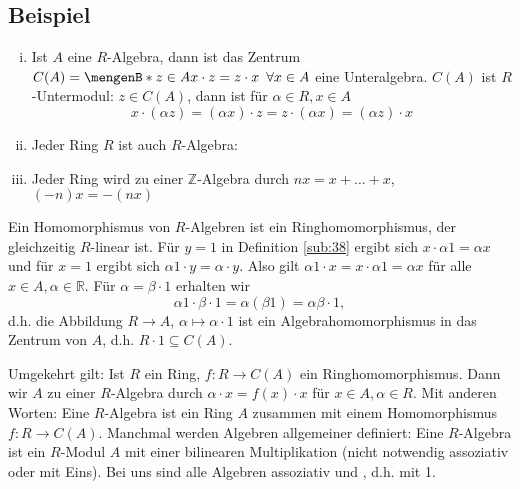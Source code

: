 \subsection[Beispiele für Algebren]{Beispiel} %
\label{sub:39}
\begin{enumerate}[(i)]
	\item Ist $A$ eine $R$-Algebra, dann ist das Zentrum $C(A) = \set[z \in A]{x \cdot z = z \cdot x \enspace \forall x \in A} $ eine Unteralgebra. 
	$C(A)$ ist $R$-Untermodul: $z \in C(A)$, dann ist für $\alpha \in R, x \in A$
		\[
			x \cdot (\alpha z) = (\alpha x) \cdot z = z \cdot (\alpha x) = (\alpha z) \cdot x
		\]
	\item Jeder Ring $R$ ist auch $R$-Algebra: 
	\item Jeder Ring wird zu einer $\mathds{Z}$-Algebra durch $n x = x + \ldots + x$, $(-n) x = - (n x)$
\end{enumerate}
Ein Homomorphismus von $R$-Algebren ist ein Ringhomomorphismus, der gleichzeitig $R$-linear ist.
Für $y=1$ in Definition \ref{sub:38} ergibt sich $x \cdot  \alpha 1 = \alpha x$ und für $x=1$ ergibt sich $\alpha 1 \cdot y = \alpha \cdot y$. Also gilt 
$\alpha 1  \cdot x = x \cdot  \alpha 1 = \alpha x$ für alle $x \in A, \alpha \in \mathds{R}$. Für $\alpha = \beta \cdot 1$ erhalten wir 
\[
	\alpha 1 \cdot \beta \cdot 1 = \alpha (\beta 1) = \alpha \beta \cdot 1,
\]
d.h. die Abbildung $R \to A$, $\alpha \mapsto \alpha \cdot 1$ ist ein Algebrahomomorphismus in das Zentrum von $A$, d.h. $R \cdot 1 \subseteq C(A)$.

Umgekehrt gilt: Ist $R$ ein Ring, $f : R \to C(A)$ ein Ringhomomorphismus. Dann wir $A$ zu einer $R$-Algebra durch $\alpha \cdot x = f(x) \cdot x$ für $x\in A,\alpha\in R$.
Mit anderen Worten: Eine $R$-Algebra ist ein Ring $A$ zusammen mit einem Homomorphismus $f : R \to C(A)$. Manchmal werden Algebren allgemeiner definiert: Eine $R$-Algebra 
ist ein $R$-Modul $A$ mit einer bilinearen Multiplikation (nicht notwendig assoziativ oder mit Eins). Bei uns sind alle Algebren assoziativ und , d.h. mit 1. 

